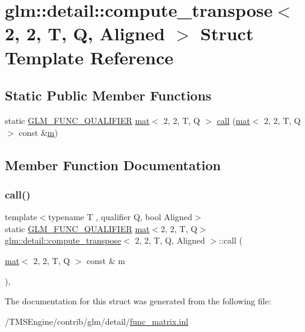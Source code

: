 \hypertarget{structglm_1_1detail_1_1compute__transpose_3_012_00_012_00_01_t_00_01_q_00_01_aligned_01_4}{}\section{glm\+:\+:detail\+:\+:compute\+\_\+transpose$<$ 2, 2, T, Q, Aligned $>$ Struct Template Reference}
\label{structglm_1_1detail_1_1compute__transpose_3_012_00_012_00_01_t_00_01_q_00_01_aligned_01_4}
\subsection*{Static Public Member Functions}
\begin{DoxyCompactItemize}
\item 
static \hyperlink{setup_8hpp_a33fdea6f91c5f834105f7415e2a64407}{G\+L\+M\+\_\+\+F\+U\+N\+C\+\_\+\+Q\+U\+A\+L\+I\+F\+I\+ER} \hyperlink{structglm_1_1mat}{mat}$<$ 2, 2, T, Q $>$ \hyperlink{structglm_1_1detail_1_1compute__transpose_3_012_00_012_00_01_t_00_01_q_00_01_aligned_01_4_ab78382e27d6683e2a71805ef245a3ac0}{call} (\hyperlink{structglm_1_1mat}{mat}$<$ 2, 2, T, Q $>$ const \&\hyperlink{_s_d_l__opengl__glext_8h_af593500c283bf1a787a6f947f503a5c2}{m})
\end{DoxyCompactItemize}


\subsection{Member Function Documentation}
\mbox{\label{structglm_1_1detail_1_1compute__transpose_3_012_00_012_00_01_t_00_01_q_00_01_aligned_01_4_ab78382e27d6683e2a71805ef245a3ac0}} 
\subsubsection{\texorpdfstring{call()}{call()}}
{\footnotesize\ttfamily template$<$typename T , qualifier Q, bool Aligned$>$ \\
static \hyperlink{setup_8hpp_a33fdea6f91c5f834105f7415e2a64407}{G\+L\+M\+\_\+\+F\+U\+N\+C\+\_\+\+Q\+U\+A\+L\+I\+F\+I\+ER} \hyperlink{structglm_1_1mat}{mat}$<$2, 2, T, Q$>$ \hyperlink{structglm_1_1detail_1_1compute__transpose}{glm\+::detail\+::compute\+\_\+transpose}$<$ 2, 2, T, Q, Aligned $>$\+::call (\begin{DoxyParamCaption}\item[{\hyperlink{structglm_1_1mat}{mat}$<$ 2, 2, T, Q $>$ const \&}]{m }\end{DoxyParamCaption})\hspace{0.3cm}{\ttfamily [inline]}, {\ttfamily [static]}}



The documentation for this struct was generated from the following file\+:\begin{DoxyCompactItemize}
\item 
/\+T\+M\+S\+Engine/contrib/glm/detail/\hyperlink{func__matrix_8inl}{func\+\_\+matrix.\+inl}\end{DoxyCompactItemize}
